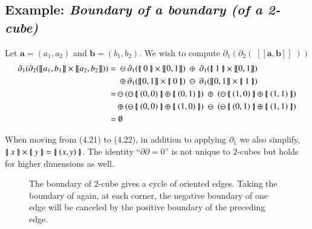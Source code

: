 \subsection{Example: \emph{Boundary of a boundary (of a 2-cube)}}
Let $\boldsymbol{a} =(a_1,a_2)$ and $\boldsymbol{b}= (b_1,b_2)$.
We wish to compute $\partial_1 ( \partial_2 ( \; [\![\boldsymbol{a}, \boldsymbol{b} ]\!] \; ) )$
\begin{align}
	\partial_1 ( \partial_2 ( [\![ a_1 , b_1 ]\!] \times [\![a_2, b_2 ]\!] ) )
	=	& 	\; \ominus 	\partial_1( \hset{0} \times [\![0,1]\!]) 
			\; \oplus \; 	\partial_1(\hset{1} \times [\![0,1]\!]) \notag \\
		& 	\; \oplus 	\partial_1( [\![0,1]\!] \times \hset{0}) 
			\; \ominus \; \partial_1([\![0,1]\!] \times \hset{1}) \\
	=	& 	\ominus	( 	\ominus \hset{(0,0)} \oplus \hset{(0,1)} ) 
			\;\oplus\;(	\ominus \hset{(1,0)} \oplus \hset{(1,1)}) \notag \\
		& 	\oplus ( 		\ominus \hset{(0,0)} \oplus \hset{(1,0)} ) 
			\;\ominus\;(	\ominus \hset{(0,1)} \oplus \hset{(1,1)}) \\
	=	& \;\emptyset	
\end{align}


When moving from (4.21) to (4.22), in addition to applying $\partial_1$ we also simplify, $\left\{ \! \left| \; x \; \right| \! \right\} \times \left\{ \! \left| \; y \; \right| \! \right\} = \left\{ \! \left| \;  (x,y)  \; \right| \! \right\}$.
The identity ``$\partial \partial = 0$'' is not unique to $2$-cubes but holds for higher dimensions as well.


\begin{figure}[ht]
\caption[Boundary of a boundary (of a 2-cube)]{The boundary of 2-cube gives a cycle of oriented edges. Taking the boundary of again, at each corner, the negative boundary of one edge will be canceled by the positive boundary of the preceding edge.}
\centering
\end{figure}


